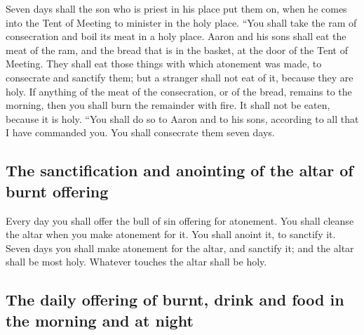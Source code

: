  Seven days shall the son who is priest in his place put
them on, when he comes into the Tent of Meeting to minister in the holy
place.  ``You shall take the ram of consecration and boil
its meat in a holy place.  Aaron and his sons shall eat
the meat of the ram, and the bread that is in the basket, at the door of
the Tent of Meeting.  They shall eat those things with
which atonement was made, to consecrate and sanctify them; but a
stranger shall not eat of it, because they are holy.  If
anything of the meat of the consecration, or of the bread, remains to
the morning, then you shall burn the remainder with fire. It shall not
be eaten, because it is holy.  ``You shall do so to Aaron
and to his sons, according to all that I have commanded you. You shall
consecrate them seven days.

\hypertarget{the-sanctification-and-anointing-of-the-altar-of-burnt-offering}{%
\subsection{The sanctification and anointing of the altar of burnt
offering}\label{the-sanctification-and-anointing-of-the-altar-of-burnt-offering}}

 Every day you shall offer the bull of sin offering for
atonement. You shall cleanse the altar when you make atonement for it.
You shall anoint it, to sanctify it.  Seven days you
shall make atonement for the altar, and sanctify it; and the altar shall
be most holy. Whatever touches the altar shall be holy.

\hypertarget{the-daily-offering-of-burnt-drink-and-food-in-the-morning-and-at-night}{%
\subsection{The daily offering of burnt, drink and food in the morning
and at
night}\label{the-daily-offering-of-burnt-drink-and-food-in-the-morning-and-at-night}}

